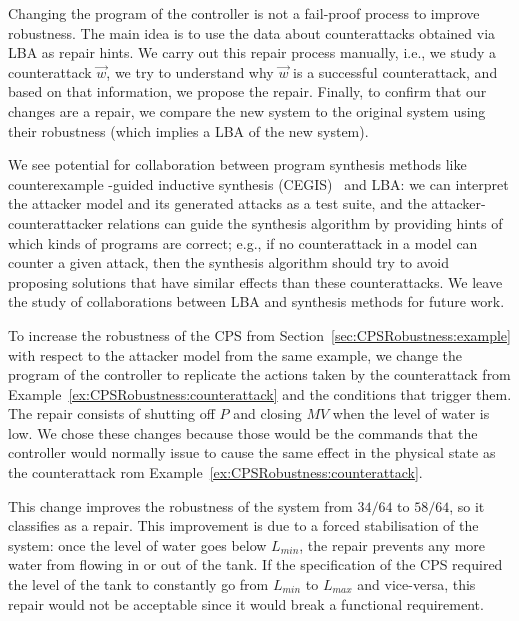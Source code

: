 {Changing the program of the controller is not a fail-proof process to improve robustness. The main idea is to use the data about counterattacks obtained via LBA as repair hints. We carry out this repair process manually, i.e., we study a counterattack $\vec{w}$, we try to understand why $\vec{w}$ is a successful counterattack, and based on that information, we propose the repair. Finally, to confirm that our changes are a repair, we compare the new system to the original system using their robustness (which implies a LBA of the new system).

We see potential for collaboration between program synthesis methods like counterexample\!\! -guided inductive synthesis (CEGIS)~\cite{CEGIS} and LBA: we can interpret the attacker model and its generated attacks as a test suite, and the attacker-counterattacker relations can guide the synthesis algorithm by providing hints of which kinds of programs are correct; e.g., if no counterattack in a model can counter a given attack, then the synthesis algorithm should try to avoid proposing solutions that have similar effects than these counterattacks. 
We leave the study of collaborations between LBA and synthesis methods for future work.

\begin{example}
  To increase the robustness of the CPS from Section~\ref{sec:CPSRobustness:example} with respect to the attacker model from the same example, we change the program of the controller to replicate the actions taken by the counterattack from Example~\ref{ex:CPSRobustness:counterattack} and the conditions that trigger them. The repair consists of shutting off $P$ and closing $MV$ when the level of water is low. We chose these changes because those would be the commands that the controller would normally issue to cause the same effect in the physical state as the counterattack rom Example~\ref{ex:CPSRobustness:counterattack}.
  
  This change improves the robustness of the system from $34/64$ to $58/64$, so it classifies as a repair. This improvement is due to a forced stabilisation of the system: once the level of water goes below $L_{min}$, the repair prevents any more water from flowing in or out of the tank. If the specification of the CPS required the level of the tank to constantly go from $L_{min}$ to $L_{max}$ and vice-versa, this repair would not be acceptable since it would break a functional requirement.
  

\end{example}}
